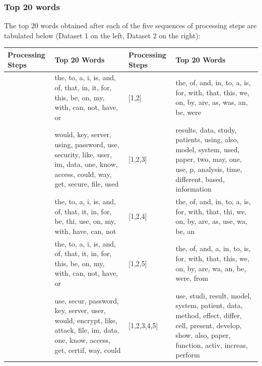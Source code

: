 \documentclass{article}
\begin{document}
\subsubsection{Top 20 words}
\begin{flushleft}
The top 20 words obtained after each of the five sequences of processing steps are tabulated below (Dataset 1 on the left, Dataset 2 on the right):
\begin{center}
\begin{tabular}{|p{}|p{}||p{}|p{}|}
\hline
Processing Steps & Top 20 Words & Processing Steps & Top 20 Words \\
\hline
\hline
[1,2] & the, to, a, i, is, and, of, that, in, it, for, this, be, on, my, with, can, not, have, or &
[1,2] & the, of, and, in, to, a, is, for, with, that, this, we, on, by, are, as, was, an, be, were\\
\hline
[1,2,3] & would, key, server, using, password, use, security, like, user, im, data, one, know, access, could, way, get, secure, file, used &[1,2,3] & results, data, study, patients, using, also, model, system, used, paper, two, may, one, use, p, analysis, time, different, based, information\\
\hline
[1,2,4] & the, to, a, i, is, and, of, that, it, in, for, be, thi, use, on, my, with, have, can, not &
[1,2,4] & the, of, and, in, to, a, is, for, with, that, thi, we, on, by, are, as, use, wa, be, an\\
\hline
[1,2,5] & the, to, a, i, is, and, of, that, it, in, for, this, be, on, my, with, can, not, have, or &
[1,2,5] & the, of, and, a, in, to, is, for, with, that, this, we, on, by, are, wa, an, be, were, from\\
\hline
[1,2,3,4,5] & use, secur, password, key, server, user, would, encrypt, like, attack, file, im, data, one, know, access, get, certif, way, could &
[1,2,3,4,5] & use, studi, result, model, system, patient, data, method, effect, differ, cell, present, develop, show, also, paper, function, activ, increas, perform\\
\hline
\end{tabular}
\end{center}
\end{flushleft}
\end{document}
